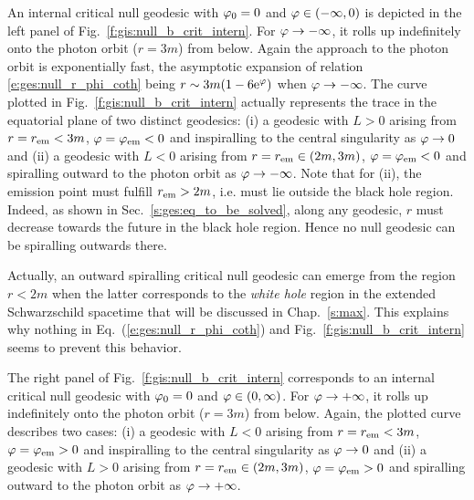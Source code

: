 An internal critical null geodesic with $\varphi_0=0$ and $\varphi\in(-\infty,0)$
is depicted in the left panel of Fig.~\ref{f:gis:null_b_crit_intern}.
For $\varphi\to -\infty$, it rolls up indefinitely onto the photon
orbit ($r=3m$) from below. Again the approach to the photon orbit is exponentially
fast, the asymptotic expansion of relation \eqref{e:ges:null_r_phi_coth} being
$r\sim 3m (1 - 6 \mathrm{e}^\varphi)$ when $\varphi\to -\infty$.
The curve plotted in Fig.~\ref{f:gis:null_b_crit_intern} actually represents the trace in the equatorial plane of two
distinct geodesics: (i) a geodesic with $L>0$ arising
from $r=r_{\rm em} < 3 m$, $\varphi=\varphi_{\rm em}<0$ and inspiralling to the
central singularity as $\varphi\to 0$ and (ii) a geodesic with $L<0$ arising from
$r = r_{\rm em} \in (2m,  3 m)$, $\varphi=\varphi_{\rm em}<0$ and spiralling outward
to the photon orbit as $\varphi\to -\infty$. Note that for (ii), the
emission point must fulfill $r_{\rm em} > 2m$, i.e. must lie outside the black
hole region. Indeed, as shown in Sec.~\ref{s:ges:eq_to_be_solved}, along
any geodesic, $r$ must decrease towards the future in the black hole region.
Hence no null geodesic can be spiralling outwards there.

\begin{remark}
Actually, an outward spiralling critical null geodesic can emerge from
the region $r<2m$ when the latter corresponds to the \emph{white hole} region
in the extended Schwarzschild spacetime that will be discussed in Chap.~\ref{s:max}.
This explains why nothing in Eq.~(\ref{e:ges:null_r_phi_coth}) and
Fig.~\ref{f:gis:null_b_crit_intern} seems to prevent
this behavior.
\end{remark}

The right panel of Fig.~\ref{f:gis:null_b_crit_intern} corresponds to an
internal critical null geodesic with $\varphi_0=0$ and $\varphi\in(0, \infty)$.
For $\varphi\to +\infty$, it rolls up indefinitely onto the photon
orbit ($r=3m$) from below. Again, the plotted curve describes two cases:
(i) a geodesic with $L<0$ arising
from $r=r_{\rm em} < 3 m$, $\varphi=\varphi_{\rm em}>0$ and inspiralling to the
central singularity as $\varphi\to 0$ and (ii) a geodesic with $L>0$ arising from
$r = r_{\rm em} \in (2m,  3 m)$, $\varphi=\varphi_{\rm em}>0$ and spiralling outward
to the photon orbit as $\varphi\to +\infty$.

